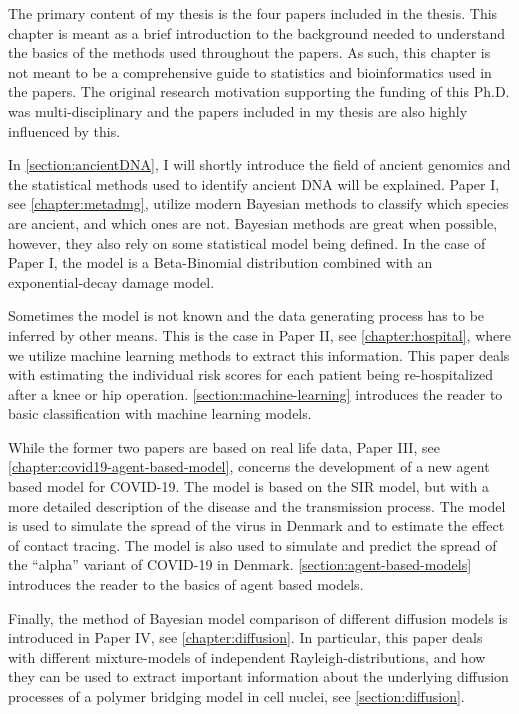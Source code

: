 The primary content of my thesis is the four papers included in the thesis. This chapter is meant as a brief introduction to the background needed to understand the basics of the methods used throughout the papers. As such, this chapter is not meant to be a comprehensive guide to statistics and bioinformatics used in the papers. The original research motivation supporting the funding of this Ph.D. was multi-disciplinary and the papers included in my thesis are also highly influenced by this.

In \autoref{section:ancientDNA}, I will shortly introduce the field of ancient genomics and the statistical methods used to identify ancient DNA will be explained. Paper I, see \autoref{chapter:metadmg}, utilize modern Bayesian methods to classify which species are ancient, and which ones are not. Bayesian methods are great when possible, however, they also rely on some statistical model being defined. In the case of Paper I, the model is a Beta-Binomial distribution combined with an exponential-decay damage model.

Sometimes the model is not known and the data generating process has to be inferred by other means. This is the case in Paper II, see \autoref{chapter:hospital}, where we utilize machine learning methods to extract this information. This paper deals with estimating the individual risk scores for each patient being re-hospitalized after a knee or hip operation. \autoref{section:machine-learning} introduces the reader to basic classification with machine learning models.

While the former two papers are based on real life data, Paper III, see \autoref{chapter:covid19-agent-based-model}, concerns the development of a new agent based model for COVID-19. The model is based on the SIR model, but with a more detailed description of the disease and the transmission process. The model is used to simulate the spread of the virus in Denmark and to estimate the effect of contact tracing. The model is also used to simulate and predict the spread of the ``alpha'' variant of COVID-19 in Denmark. \autoref{section:agent-based-models} introduces the reader to the basics of agent based models.

Finally, the method of Bayesian model comparison of different diffusion models is introduced in Paper IV, see \autoref{chapter:diffusion}. In particular, this paper deals with different mixture-models of independent Rayleigh-distributions, and how they can be used to extract important information about the underlying diffusion processes of a polymer bridging model in cell nuclei, see \autoref{section:diffusion}.

